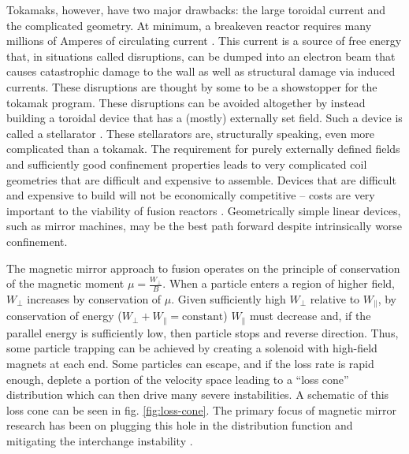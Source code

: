 Tokamaks, however, have two major drawbacks: the large toroidal current and the complicated geometry. At minimum, a breakeven reactor requires many millions of Amperes of circulating current \cite{creely_overview_2020}. This current is a source of free energy that, in situations called disruptions, can be dumped into an electron beam that causes catastrophic damage to the wall as well as structural damage via induced currents. These disruptions are thought by some to be a showstopper for the tokamak program. These disruptions can be avoided altogether by instead building a toroidal device that has a (mostly) externally set field. Such a device is called a stellarator \cite{boozer_what_1998}. These stellarators are, structurally speaking, even more complicated than a tokamak. The requirement for purely externally defined fields and sufficiently good confinement properties leads to very complicated coil geometries that are difficult and expensive to assemble. Devices that are difficult and expensive to build will not be economically competitive -- costs are very important to the viability of fusion reactors \cite{schwartz_value_2023}. Geometrically simple linear devices, such as mirror machines, may be the best path forward despite intrinsically worse confinement. 

The magnetic mirror approach to fusion \cite{Post_1987} operates on the principle of conservation of the magnetic moment $\mu = \frac{W_\perp}{B}$. When a particle enters a region of higher field, $W_\perp$ increases by conservation of $\mu$. Given sufficiently high $W_\perp$ relative to $W_\parallel$, by conservation of energy ($W_\perp + W_\parallel = \text{constant}$) $W_\parallel$ must decrease and, if the parallel energy is sufficiently low, then particle stops and reverse direction. Thus, some particle trapping can be achieved by creating a solenoid with high-field magnets at each end. Some particles can escape, and if the loss rate is rapid enough, deplete a portion of the velocity space leading to a ``loss cone'' distribution which can then drive many severe instabilities. A schematic of this loss cone can be seen in fig. \ref{fig:loss-cone}. The primary focus of magnetic mirror research has been on plugging this hole in the distribution function and mitigating the interchange instability \cite{Post_1987}.

